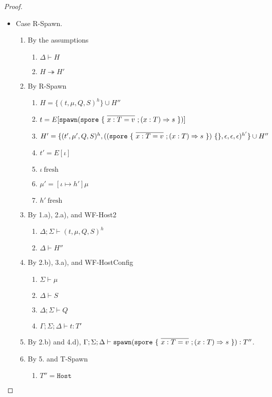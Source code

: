 \begin{proof}
\begin{itemize}
\item Case R-Spawn.
\begin{enumerate}
\item By the assumptions
  \begin{enumerate}[label=(\alph*)]
  \item $\Delta \vdash H$
  \item $H \twoheadrightarrow H'$
  \end{enumerate}
\item By R-Spawn
  \begin{enumerate}[label=(\alph*)]
  \item $H = \{ (t, \mu, Q, S)^h \} \cup H''$
  \item $t = E[\texttt{spawn}(\texttt{spore}~\{~\overline{x : T = v}~; (x: T) \Rightarrow s~\})]$
  \item $H' = \{ (t', \mu', Q, S)^h, ((\texttt{spore}~\{~\overline{x : T = v}~; (x: T) \Rightarrow s~\})~\{\}, \epsilon, \epsilon, \epsilon)^{h'} \} \cup H''$
  \item $t' = E[\iota]$
  \item $\iota~\text{fresh}$  %
  \item $\mu' = [\iota \mapsto h']\mu$
  \item $h'~\text{fresh}$
  \end{enumerate}
\item By 1.a), 2.a), and WF-Host2
  \begin{enumerate}[label=(\alph*)]
  \item $\Delta ; \Sigma \vdash (t, \mu, Q, S)^h$
  \item $\Delta \vdash H''$
  \end{enumerate}
\item By 2.b), 3.a), and WF-HostConfig
  \begin{enumerate}[label=(\alph*)]
  \item $\Sigma \vdash \mu$
  \item $\Delta \vdash S$
  \item $\Delta ; \Sigma \vdash Q$       %
  \item $\Gamma ; \Sigma ; \Delta \vdash t : T'$  %
  \end{enumerate}
\item By 2.b) and 4.d), $\Gamma ; \Sigma ; \Delta \vdash \texttt{spawn}(\texttt{spore}~\{~\overline{x : T = v}~; (x: T) \Rightarrow s~\}) : T''$.
\item By 5. and T-Spawn
  \begin{enumerate}[label=(\alph*)]
  \item $T'' = \texttt{Host}$

\end{enumerate}
\end{enumerate}
\end{itemize}
\end{proof}
